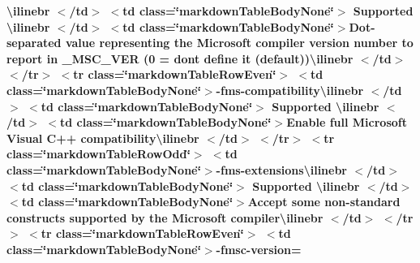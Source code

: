 \begin{longtabu}
{\bfseries{{\ttfamily \textbackslash{}ilinebr \texorpdfstring{$<$}{<}/td\texorpdfstring{$>$}{>} \texorpdfstring{$<$}{<}td class=\char`\"{}markdown\+Table\+Body\+None\char`\"{}\texorpdfstring{$>$}{>} Supported \textbackslash{}ilinebr \texorpdfstring{$<$}{<}/td\texorpdfstring{$>$}{>} \texorpdfstring{$<$}{<}td class=\char`\"{}markdown\+Table\+Body\+None\char`\"{}\texorpdfstring{$>$}{>}}Dot-\/separated value representing the Microsoft compiler version number to report in \+\_\+\+MSC\+\_\+\+VER (0 = don\textquotesingle{}t define it (default)){\ttfamily \textbackslash{}ilinebr \texorpdfstring{$<$}{<}/td\texorpdfstring{$>$}{>} \texorpdfstring{$<$}{<}/tr\texorpdfstring{$>$}{>} \texorpdfstring{$<$}{<}tr class=\char`\"{}markdown\+Table\+Row\+Even\char`\"{}\texorpdfstring{$>$}{>} \texorpdfstring{$<$}{<}td class=\char`\"{}markdown\+Table\+Body\+None\char`\"{}\texorpdfstring{$>$}{>}}-\/fms-\/compatibility{\ttfamily \textbackslash{}ilinebr \texorpdfstring{$<$}{<}/td\texorpdfstring{$>$}{>} \texorpdfstring{$<$}{<}td class=\char`\"{}markdown\+Table\+Body\+None\char`\"{}\texorpdfstring{$>$}{>} Supported \textbackslash{}ilinebr \texorpdfstring{$<$}{<}/td\texorpdfstring{$>$}{>} \texorpdfstring{$<$}{<}td class=\char`\"{}markdown\+Table\+Body\+None\char`\"{}\texorpdfstring{$>$}{>}}Enable full Microsoft Visual C++ compatibility{\ttfamily \textbackslash{}ilinebr \texorpdfstring{$<$}{<}/td\texorpdfstring{$>$}{>} \texorpdfstring{$<$}{<}/tr\texorpdfstring{$>$}{>} \texorpdfstring{$<$}{<}tr class=\char`\"{}markdown\+Table\+Row\+Odd\char`\"{}\texorpdfstring{$>$}{>} \texorpdfstring{$<$}{<}td class=\char`\"{}markdown\+Table\+Body\+None\char`\"{}\texorpdfstring{$>$}{>}}-\/fms-\/extensions{\ttfamily \textbackslash{}ilinebr \texorpdfstring{$<$}{<}/td\texorpdfstring{$>$}{>} \texorpdfstring{$<$}{<}td class=\char`\"{}markdown\+Table\+Body\+None\char`\"{}\texorpdfstring{$>$}{>} Supported \textbackslash{}ilinebr \texorpdfstring{$<$}{<}/td\texorpdfstring{$>$}{>} \texorpdfstring{$<$}{<}td class=\char`\"{}markdown\+Table\+Body\+None\char`\"{}\texorpdfstring{$>$}{>}}Accept some non-\/standard constructs supported by the Microsoft compiler{\ttfamily \textbackslash{}ilinebr \texorpdfstring{$<$}{<}/td\texorpdfstring{$>$}{>} \texorpdfstring{$<$}{<}/tr\texorpdfstring{$>$}{>} \texorpdfstring{$<$}{<}tr class=\char`\"{}markdown\+Table\+Row\+Even\char`\"{}\texorpdfstring{$>$}{>} \texorpdfstring{$<$}{<}td class=\char`\"{}markdown\+Table\+Body\+None\char`\"{}\texorpdfstring{$>$}{>}}-\/fmsc-\/version=}}


\end{longtabu}
